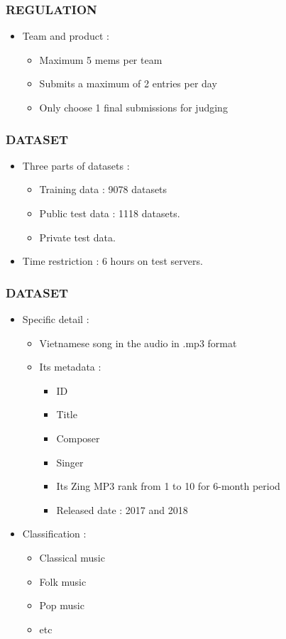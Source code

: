 \documentclass[11pt]{beamer}
\begin{document}
\begin{frame}
\frametitle{REGULATION}
\begin{itemize}
	\item Team and product : 
	\begin{itemize}
		\item Maximum 5 mems per team
		\item Submits a maximum of 2 entries per day
		\item Only choose 1 final submissions for judging
	\end{itemize}

\end{itemize}
\end{frame}

\begin{frame}
\frametitle{DATASET}
\begin{itemize}
	\pause\item Three parts of datasets : 
	\begin{itemize}
		\item Training data : 9078 datasets
		\item Public test data : 1118 datasets.
		\item Private test data.
	\end{itemize}
	\pause\item Time restriction : 6 hours on test servers.
\end{itemize}
\end{frame}

\begin{frame}
	\frametitle{DATASET}
	\begin{itemize}
		\item Specific detail :
		\pause \begin{itemize}
			\item Vietnamese song in the audio in .mp3 format
			\item Its metadata : 
			\begin{itemize}
				\item ID
				\item Title
				\item Composer
				\item Singer
				\item Its Zing MP3 rank from 1 to 10 for 6-month period
				\item Released date : 2017 and 2018
			\end{itemize}
		\end{itemize}
		\pause\item Classification : 
		\begin{itemize}
			\item Classical music
			\item Folk music
			\item Pop music 
			\item etc
		\end{itemize}
	\end{itemize}
\end{frame}
\end{document}
